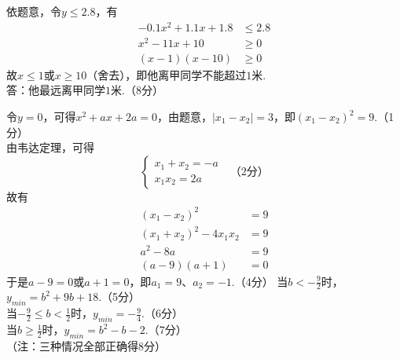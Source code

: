 \documentclass[10pt]{article}
\begin{document}
\begin{questions}{\answeringintroduction}
\begin{subquestions}
        \subquestion 依题意，令$y \leq 2.8$，有
        $$\begin{aligned}
            -0.1x^2+1.1x+1.8 & \leq 2.8 \\
            x^2-11x+10 & \geq 0 \\
            (x-1)(x-10) & \geq 0
        \end{aligned}$$
        故$x \leq 1$或$x \geq 10$（舍去），即他离甲同学不能超过$1$米. \\
        答：他最远离甲同学$1$米.（8分）
    \end{subquestions}
    \question %
    \begin{subquestions}
        \subquestion 令$y=0$，可得$x^2+ax+2a=0$，由题意，$\left|x_1-x_2\right|=3$，即$(x_1-x_2)^2=9$.（1分）\\
        由韦达定理，可得
        $$\begin{cases}
            x_1+x_2=-a \\
            x_1x_2=2a
        \end{cases}\ \ \ （2分）$$
        故有
        $$\begin{aligned}
            (x_1-x_2)^2 &= 9 \\
            (x_1+x_2)^2 - 4x_1x_2 &= 9 \\
            a^2-8a &= 9 \\
            (a-9)(a+1) &= 0
        \end{aligned}$$
        于是$a-9=0$或$a+1=0$，即$a_1 = 9$、$a_2 = -1$.（4分）
        \subquestion 当$b < -\frac{9}{2}$时，$y_{min} = b^2+9b+18$.（5分） \\
        当$-\frac{9}{2} \leq b < \frac{1}{2}$时，$y_{min} = -\frac{9}{4}$.（6分） \\
        当$b \geq \frac{1}{2}$时，$y_{min} = b^2-b-2$.（7分） \\
        （注：三种情况全部正确得8分）
    \end{subquestions}
    \question %
\end{questions}
\end{document}
